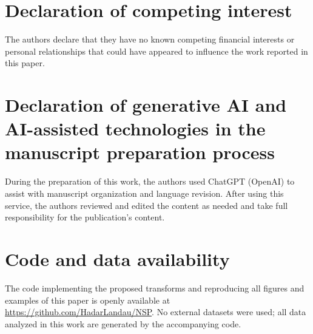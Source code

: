 \documentclass[11pt,a4paper]{article}
\theoremstyle{definition}
\begin{document}
\section*{Declaration of competing interest}
The authors declare that they have no known competing financial interests or personal relationships that could have appeared to influence the work reported in this paper.

\section*{Declaration of generative AI and AI-assisted technologies in the manuscript preparation process}
During the preparation of this work, the authors used ChatGPT (OpenAI) to assist with manuscript organization and language revision. After using this service, the authors reviewed and edited the content as needed and take full responsibility for the publication's content.

\section*{Code and data availability}
The code implementing the proposed transforms and reproducing all figures and examples of this paper is openly available at \url{https://github.com/HadarLandau/NSP}. No external datasets were used; all data analyzed in this work are generated by the accompanying code.



\end{document}
